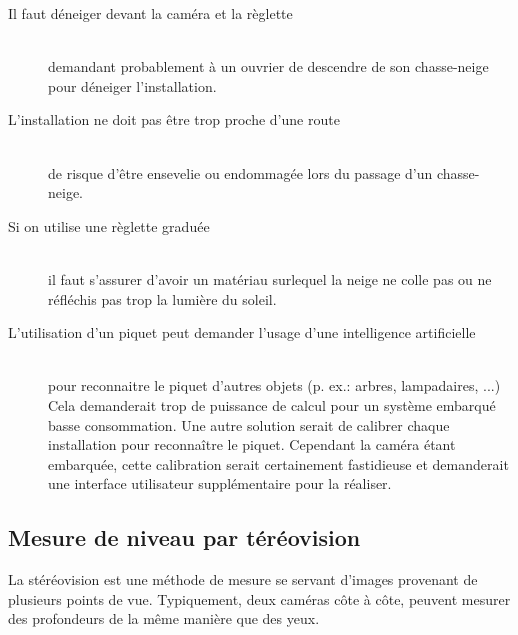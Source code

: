 \begin{description}
    \item[Il faut déneiger devant la caméra et la règlette] \hfill \\
    demandant probablement à un ouvrier de descendre de son chasse-neige pour déneiger l'installation.
    \item[L'installation ne doit pas être trop proche d'une route] \hfill \\ 
    de risque d'être ensevelie ou endommagée lors du passage d'un chasse-neige.
    \item[Si on utilise une règlette graduée] \hfill \\ 
    il faut s'assurer d'avoir un matériau surlequel la neige ne colle pas ou 
    ne réfléchis pas trop la lumière du soleil.
    \item[L'utilisation d'un piquet peut demander l'usage d'une intelligence artificielle \cite{SnowTimeLapse}] \hfill \\
    pour reconnaitre le piquet d'autres objets (p. ex.: arbres, lampadaires, ...)
    Cela demanderait trop de puissance de calcul pour un système embarqué basse consommation.
    Une autre solution serait de calibrer chaque installation pour reconnaître le piquet.
    Cependant la caméra étant embarquée, cette calibration serait certainement
    fastidieuse et demanderait une interface utilisateur supplémentaire pour la réaliser.
\end{description}
\newpage

\subsection{Mesure de niveau par téréovision}
La stéréovision est une méthode de mesure se servant d'images provenant de plusieurs points de vue.
Typiquement, deux caméras côte à côte, peuvent mesurer des profondeurs de la même manière que des yeux.

